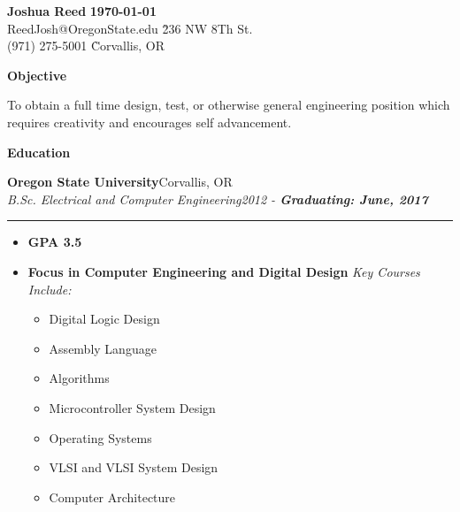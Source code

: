 \documentclass[margin, line]{res}
\newcommand{\resheading}[1]{
  \begin{tcolorbox}[width=\textwidth,
                    frame hidden,
                    colback=black!30,
                    enhanced,
                    top=0pt,
                    bottom=0pt,
                    height=16pt
                    ]
      \bf #1
  \end{tcolorbox}
  }
\newcommand{\ressubheading}[4]{
  \begin{minipage}{\textwidth}
  {\textbf{#1}\hfill #2} \\
  {\textit{#3}\hfill \textit{#4}}
  \end{minipage}
  \rule{\textwidth}{1pt}
  }
\begin{document}

\begin{tabbing}
  \textbf{\Large Joshua Reed} \` \textbf{\today} \\
  ReedJosh@OregonState.edu    \` 236 NW 8Th St. \\
  (971) 275-5001              \`  Corvallis, OR \\ 
\end{tabbing}

\resheading{Objective}

To obtain a full time design, test, or otherwise general engineering position 
which requires creativity and encourages self advancement. 

\resheading{Education}

\ressubheading{Oregon State University}
              {Corvallis, OR}
              {B.Sc. Electrical and Computer Engineering}
              {2012 - \textbf{Graduating: June, 2017}}
\begin{itemize}[nolistsep, noitemsep, topsep=0pt]
  \item{\bf GPA 3.5}
  \item{\bf Focus in Computer Engineering and Digital Design} {\it Key Courses Include:}
    \setlength{\multicolsep}{0pt}
    \begin{multicols}{2}    
      \begin{itemize}[nolistsep,noitemsep,topsep=0pt]
        \item Digital Logic Design  
        \item Assembly Language 
        \item Algorithms 
        \item Microcontroller System Design 
        \item Operating Systems 
        \item VLSI and VLSI System Design 
        \item Computer Architecture 
      \end{itemize}
    \end{multicols}
\end{itemize}
\end{document}
